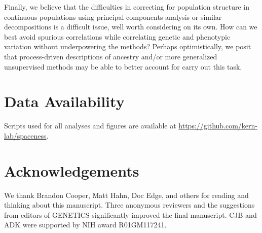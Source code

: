 \documentclass[10pt,twoside,lineno,hidelinks]{preprint}
\begin{document}

Finally, we believe that the difficulties in correcting for population structure in continuous populations 
using principal components analysis or similar decompositions is a difficult issue, well worth considering on its own.
How can we best avoid spurious correlations while correlating genetic and phenotypic variation 
without underpowering the methods?
Perhaps optimistically,
we posit that process-driven descriptions of ancestry  
and/or more generalized unsupervised methods may be able to better account for carry out this task.


\section{Data Availability}
Scripts used for all analyses and figures are available at \url{https://github.com/kern-lab/spaceness}. 

\section{Acknowledgements}
We thank Brandon Cooper, Matt Hahn, Doc Edge, and others for reading and thinking about this manuscript. 
Three anonymous reviewers and the suggestions from editors of GENETICS significantly improved the final manuscript. 
CJB and ADK were supported by NIH award R01GM117241. 






\appendix
\setcounter{table}{0}
\renewcommand{\thetable}{A\arabic{table}}%
\setcounter{figure}{0}
\renewcommand{\thefigure}{A\arabic{figure}}%
\end{document}
